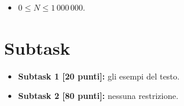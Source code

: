 



\begin{itemize}[nolistsep, noitemsep]
  \item $0 \le N \le 1\,000\,000$.
\end{itemize}
  
  \section*{Subtask}
  \begin{itemize}
    \item \textbf{Subtask 1 [20 punti]:} gli esempi del testo.
    \item \textbf{Subtask 2 [80 punti]:} nessuna restrizione.
  \end{itemize}
  
